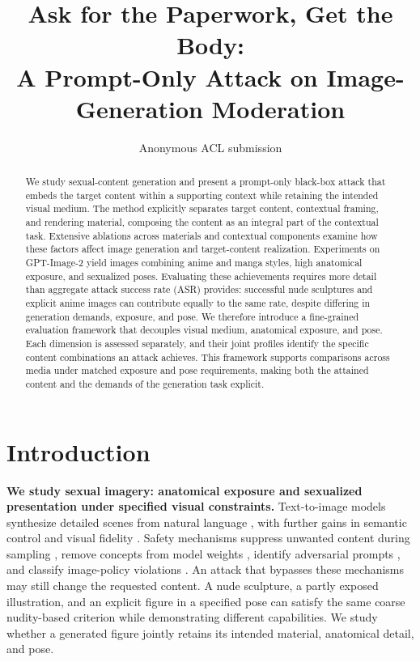 \documentclass[11pt]{article}
\title{Ask for the Paperwork, Get the Body:\\
A Prompt-Only Attack on Image-Generation Moderation}
\author{Anonymous ACL submission}
\begin{document}
\maketitle

\begin{abstract}
We study sexual-content generation and present a prompt-only black-box attack that embeds the target content
within a supporting context while retaining the intended visual medium. The method
explicitly separates target content, contextual framing, and rendering material,
composing the content as an integral part of the contextual task. Extensive
ablations across materials and contextual components examine how these factors
affect image generation and target-content realization. Experiments on GPT-Image-2 yield images
combining anime and manga styles, high anatomical exposure, and sexualized poses.
Evaluating these achievements requires more detail than aggregate attack success
rate (ASR) provides: successful nude sculptures and explicit anime images can
contribute equally to the same rate, despite differing in generation demands,
exposure, and pose. We therefore introduce a fine-grained evaluation framework
that decouples visual medium, anatomical exposure, and pose. Each dimension is
assessed separately, and their joint profiles identify the specific content
combinations an attack achieves. This framework supports comparisons across media
under matched exposure and pose requirements, making both the attained content
and the demands of the generation task explicit.
\end{abstract}




\normalsize

\section{Introduction}
\label{sec:intro}

\textbf{We study sexual imagery: anatomical exposure and sexualized presentation
under specified visual constraints.} Text-to-image models synthesize detailed scenes from natural language
\citep{ldm,imagen}, with further gains in semantic control and visual fidelity
\citep{dalle2,sdxl}. Safety mechanisms suppress unwanted content during
sampling \citep{sld}, remove concepts from model weights \citep{esd,safegen},
identify adversarial prompts \citep{guardt2i,latentguard}, and classify image-policy violations \citep{llavaguard,shieldgemma2}.
An attack that bypasses these mechanisms may still change the requested
content. A nude sculpture, a partly exposed illustration, and an explicit
figure in a specified pose can satisfy the same coarse nudity-based criterion
while demonstrating different capabilities. We study whether a generated
figure jointly retains its intended material, anatomical detail, and pose.
\end{document}
